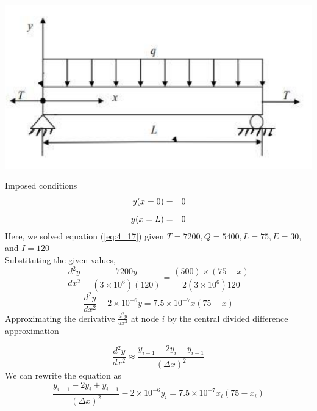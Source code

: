 \documentclass[12pt]{report}
\newcommand{\sps}{\\[0.2cm]}
\newcommand{\refn}[1]{(\ref{#1})}
\newcommand{\refx}[1]{\refn{eq:#1}}
\newcommand{\dsp}{\displaystyle}
\begin{document}
	\begin{center}
		\includegraphics[width=1\textwidth]{beam.png}
	\end{center}
	Imposed conditions
	\begin{eqnarray}
		y(x=0) &=& 0\notag\sps
		y(x=L) &=& 0\notag
	\end{eqnarray}
	Here, we solved equation \refx{4_17} given $T = 7200, Q =5400, L= 75, E = 30$, and $I =120$\sps
	Substituting the given values,
	\begin{equation*}
		\frac{d^2y}{dx^2} - \frac{7200y}{(3 \times 10^6)(120)}=\frac{(500)\times(75-x)}{2(3\times 10^6)120}
	\end{equation*}
	\begin{equation*}
		\frac{d^2y}{dx^2}-2 \times 10^{-6}y = 7.5 \times 10^{-7}x(75-x)
	\end{equation*}
	Approximating the derivative $\dsp\frac{d^2y}{dx^2}$ at node $i$ by the central divided difference approximation
	\begin{center}
	\end{center}
	\begin{equation*}
		\frac{d^2y}{dx^2} \approx \frac{y_{i+1} - 2y_i + y_{i-1}}{(\Delta x)^2}
	\end{equation*}
	We can rewrite the equation as
	\begin{equation*}
		\frac{y_{i+1} - 2y_i + y_{i-1}}{(\Delta x)^2} - 2 \times 10^{-6}y_i = 7.5 \times 10^{-7}x_i(75-x_i)
	\end{equation*}
	
\end{document}
